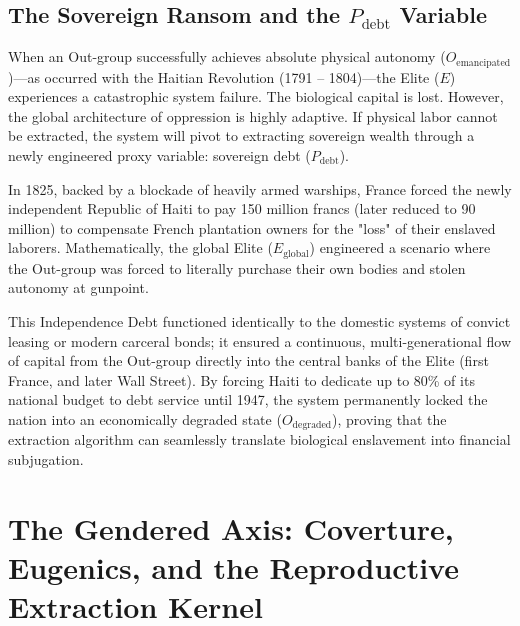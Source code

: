 \documentclass[12pt,openany]{book}
\begin{document}
\section{The Sovereign Ransom and the \texorpdfstring{$P_{\text{debt}}$}{P\_debt} Variable}

When an Out-group successfully achieves absolute physical autonomy ($O_{\text{emancipated}}$)—as occurred with the Haitian Revolution (1791 -- 1804)—the Elite ($E$) experiences a catastrophic system failure. The biological capital is lost. However, the global architecture of oppression is highly adaptive. If physical labor cannot be extracted, the system will pivot to extracting sovereign wealth through a newly engineered proxy variable: sovereign debt ($P_{\text{debt}}$).

In 1825, backed by a blockade of heavily armed warships, France forced the newly independent Republic of Haiti to pay 150 million francs (later reduced to 90 million) to compensate French plantation owners for the "loss" of their enslaved laborers. Mathematically, the global Elite ($E_{\text{global}}$) engineered a scenario where the Out-group was forced to literally purchase their own bodies and stolen autonomy at gunpoint.

This Independence Debt functioned identically to the domestic systems of convict leasing or modern carceral bonds; it ensured a continuous, multi-generational flow of capital from the Out-group directly into the central banks of the Elite (first France, and later Wall Street). By forcing Haiti to dedicate up to 80\% of its national budget to debt service until 1947, the system permanently locked the nation into an economically degraded state ($O_{\text{degraded}}$), proving that the extraction algorithm can seamlessly translate biological enslavement into financial subjugation.


\chapter{The Gendered Axis: Coverture, Eugenics, and the Reproductive Extraction Kernel}
\end{document}
